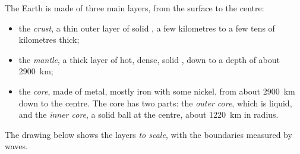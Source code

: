 \begin{definition}\label{def:g6:inside-the-earth:layers}
The Earth is made of three main layers, from the surface to the centre:
\begin{itemize}
  \item the \emph{crust}, a thin outer layer of solid , a
        few kilometres to a few tens of kilometres thick;
  \item the \emph{mantle}, a thick layer of hot, dense,
        solid , down to a depth of about 2900~km;
  \item the \emph{core}, made of metal, mostly iron with some
        nickel, from about 2900~km down to the centre. The core has two
        parts: the \emph{outer core}, which is liquid, and
        the \emph{inner core}, a solid ball at the centre,
        about 1220~km in radius.
\end{itemize}
\end{definition}

The drawing below shows the layers \emph{to scale}, with the boundaries
measured by  waves.

